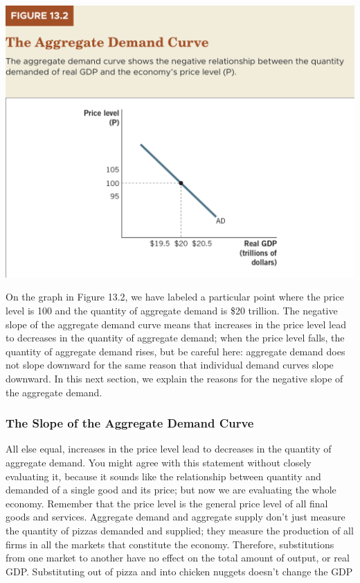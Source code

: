 \documentclass[11pt]{article} %
\begin{document}
\begin{center}
\includegraphics[scale=0.5]{images/Figure 13.2.png} 
\end{center}

On the graph in Figure 13.2, we have labeled a particular point where the price level is 100 and the quantity of aggregate demand is \$20 trillion. The negative slope of the aggregate demand curve means that increases in the price level lead to decreases in the quantity of aggregate demand; when the price level falls, the quantity of aggregate demand rises, but be careful here: aggregate demand does not slope downward for the same reason that individual demand curves slope downward. In this next section, we explain the reasons for the negative slope of the aggregate demand.

\subsubsection*{The Slope of the Aggregate Demand Curve}
All else equal, increases in the price level lead to decreases in the quantity of aggregate demand. You might agree with this statement without closely evaluating it, because it sounds like the relationship between quantity and demanded of a single good and its price; but now we are evaluating the whole economy. Remember that the price level is the general price level of all final goods and services. Aggregate demand and aggregate supply don't just measure the quantity of pizzas demanded and supplied; they measure the production of all firms in all the markets that constitute the economy. Therefore, substitutions from one market to another have no effect on the total amount of output, or real GDP. Substituting out of pizza and into chicken nuggets doesn't change the GDP
\end{document}

